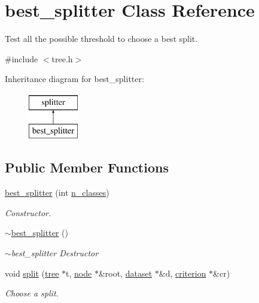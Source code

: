 \hypertarget{classbest__splitter}{\section{best\+\_\+splitter Class Reference}
\label{classbest__splitter}
}


Test all the possible threshold to choose a best split.  




{\ttfamily \#include $<$tree.\+h$>$}

Inheritance diagram for best\+\_\+splitter\+:\begin{figure}[H]
\begin{center}
\leavevmode
\includegraphics[height=2.000000cm]{classbest__splitter}
\end{center}
\end{figure}
\subsection*{Public Member Functions}
\begin{DoxyCompactItemize}
\item 
\hyperlink{classbest__splitter_a40d856f885a1ed21fa840063b8d49164}{best\+\_\+splitter} (int \hyperlink{classsplitter_abfc53538ed65c0afd50aedbf46dff458}{n\+\_\+classes})
\begin{DoxyCompactList}\small\item\em Constructor. \end{DoxyCompactList}\item 
\hyperlink{classbest__splitter_aebb6c7381f0c3643b61c5cf060908655}{$\sim$best\+\_\+splitter} ()
\begin{DoxyCompactList}\small\item\em $\sim$best\+\_\+splitter Destructor \end{DoxyCompactList}\item 
void \hyperlink{classbest__splitter_a1ff1e766bfa4fb6d41c23121d6dd3dbb}{split} (\hyperlink{classtree}{tree} $\ast$t, \hyperlink{classnode}{node} $\ast$\&root, \hyperlink{classdataset}{dataset} $\ast$\&d, \hyperlink{classcriterion}{criterion} $\ast$\&cr)
\begin{DoxyCompactList}\small\item\em Choose a split. \end{DoxyCompactList}\end{DoxyCompactItemize}
